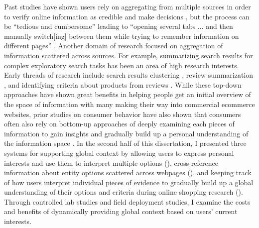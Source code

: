 Past studies have shown users rely on aggregating from multiple sources in order to verify online information as credible and make decisions \cite{fox2000online,cotten2004characteristics,racherla2012perceived}, but the process can be ``tedious and cumbersome'' leading to ``opening several tabs ... and then manually switch[ing] between them while trying to remember information on different pages'' \cite{greis2017increasing,bhavnani2005difficult}. Another domain of research focused on aggregation of information scattered across sources. For example, summarizing search results for complex exploratory search tasks has been an area of high research interests. Early threads of research include search results clustering \cite{zamir1999grouper,zeng2004learning}, review summarization \cite{manek2017aspect,yu2011aspect}, and identifying criteria about products from reviews \cite{hu2004mining,li2010structure}. While these top-down approaches have shown great benefits in helping people get an initial overview of the space of information with many making their way into commercial ecommerce websites, prior studies on consumer behavior have also shown that consumers often also rely on bottom-up approaches of deeply examining each pieces of information to gain insights and gradually build up a personal understanding of the information space \cite{gan2012helpfulness,mudambi2010research}. In the second half of this dissertation, I presented three systems for supporting global context by allowing users to express personal interests and use them to interpret multiple options  (), cross-reference information about entity options scattered across webpages (), and keeping track of how users interpret individual pieces of evidence to gradually build up a global understanding of their options and criteria during online shopping research (). Through controlled lab studies and field deployment studies, I examine the costs and benefits of dynamically providing global context based on users’ current interests.
